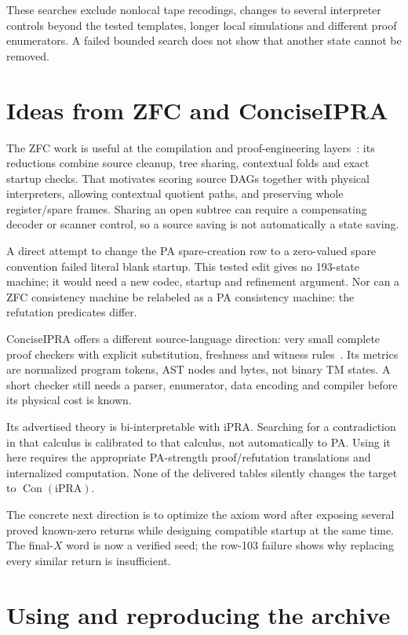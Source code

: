 \documentclass[11pt,letterpaper]{article}
\newcommand{\Con}{\operatorname{Con}}
\begin{document}
These searches exclude nonlocal tape recodings, changes to several
interpreter controls beyond the tested templates, longer local
simulations and different proof enumerators. A failed bounded search
does not show that another state cannot be removed.

\section{Ideas from ZFC and ConciseIPRA}
\label{sec:related}

The ZFC work is useful at the compilation and proof-engineering
layers~\cite{zfc}: its reductions combine source cleanup, tree sharing,
contextual folds and exact startup checks. That motivates scoring
source DAGs together with physical interpreters, allowing contextual
quotient paths, and preserving whole register/spare frames. Sharing
an open subtree can require a compensating decoder or scanner control,
so a source saving is not automatically a state saving.

A direct attempt to change the PA spare-creation row to a zero-valued
spare convention failed literal blank startup. This tested edit gives
no 193-state machine; it would need a new codec, startup and refinement
argument. Nor can a ZFC consistency machine be relabeled as a PA
consistency machine: the refutation predicates differ.

ConciseIPRA offers a different source-language direction: very small
complete proof checkers with explicit substitution, freshness and
witness rules~\cite{concise}. Its metrics are normalized program tokens,
AST nodes and bytes, not binary TM states. A short checker still needs
a parser, enumerator, data encoding and compiler before its physical
cost is known.

Its advertised theory is bi-interpretable with iPRA. Searching for a
contradiction in that calculus is calibrated to that calculus, not
automatically to PA. Using it here requires the appropriate
PA-strength proof/refutation translations and internalized computation.
None of the delivered tables silently changes the target to
$\Con(\mathrm{iPRA})$.

The concrete next direction is to optimize the axiom word after
exposing several proved known-zero returns while designing compatible
startup at the same time. The final-$X$ word is now a verified seed;
the row-103 failure shows why replacing every similar return is
insufficient.

\section{Using and reproducing the archive}
\label{sec:reproduce}
\end{document}
